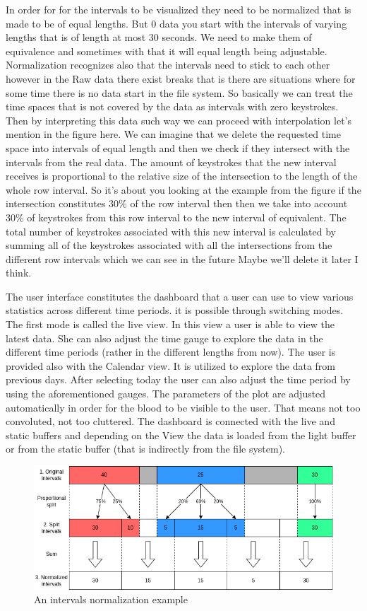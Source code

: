 In order for for the intervals to be visualized they need to be normalized that is made to be of equal lengths. But 0 data you start with the intervals of varying lengths that is of length at most 30 seconds. We need to make them of equivalence and sometimes with that it will equal length being adjustable. Normalization recognizes also that the intervals need to stick to each other however in the Raw data there exist breaks that is there are situations where for some time there is no data start in the file system. So basically we can treat the time spaces that is not covered by the data as intervals with zero keystrokes. Then by interpreting this data such way we can proceed with interpolation let's mention in the figure here. We can imagine that we delete the requested time space into intervals of equal length and then we check if they intersect with the intervals from the real data. The amount of keystrokes that the new interval receives is proportional to the relative size of the intersection to the length of the whole row interval. So it's about you looking at the example from the figure if the intersection constitutes 30\% of the row interval then then we take into account 30\% of keystrokes from this row interval to the new interval of equivalent. The total number of keystrokes associated with this new interval is calculated by summing all of the keystrokes associated with all the intersections from the different row intervals which we can see in the future Maybe we'll delete it later I think.

The user interface constitutes the dashboard that a user can use to view various statistics across different time periods. it is possible through switching modes. The first mode is called the live view.  In this view a user is able to view the latest data. She can also adjust the  time gauge to explore the data in the different time periods (rather in the different lengths from now). The user is provided also with the Calendar view. It is utilized to explore the data from previous days. After selecting today the user can also adjust the time period by using the aforementioned gauges. The parameters of the plot are adjusted automatically in order for the blood to be visible to the user. That means not too convoluted, not too cluttered. The dashboard is connected with the live and static buffers and depending on the View the data is loaded from the light buffer or from the static buffer (that is indirectly from the file system).

\begin{figure}[htbp]
  \centering
  \includegraphics[scale=0.5]{chapters/normalization.png}
  \caption{An intervals normalization example}
\end{figure}

